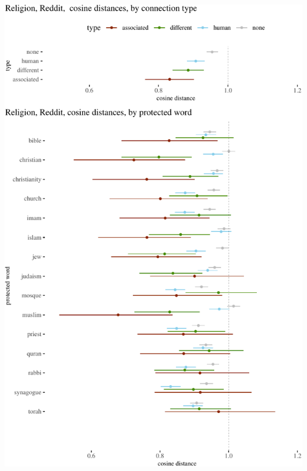\documentclass{clv3}
\begin{document}
\begin{center}\includegraphics[width=1\linewidth]{figures/resultsReligionReddita} \end{center}
\end{document}

